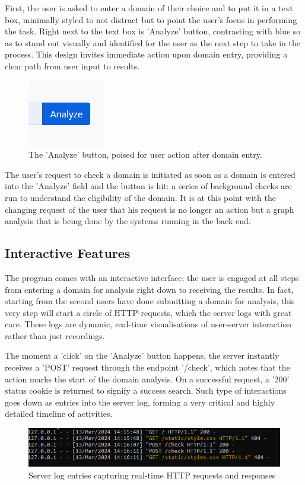 First, the user is asked to enter a domain of their choice and to put it in a text box, minimally styled to not distract but to point the user's focus in performing the task. Right next to the text box is 'Analyze' button, contrasting with blue so as to stand out visually and identified for the user as the next step to take in the process. This design invites immediate action upon domain entry, providing a clear path from user input to results.

\begin{figure}[H]
    \centering
    \includegraphics[width=0.3\linewidth]{project/8.png}
    \caption{The 'Analyze' button, poised for user action after domain entry.}
    \label{fig:imple2222}
\end{figure}

The user's request to check a domain is initiated as soon as a domain is entered into the 'Analyze' field and the button is hit: a series of background checks are run to understand the eligibility of the domain. It is at this point with the changing request of the user that his request is no longer an action but a graph analysis that is being done by the systems running in the back end.

\subsection{Interactive Features}

The program comes with an interactive interface; the user is engaged at all steps from entering a domain for analysis right down to receiving the results. In fact, starting from the second users have done submitting a domain for analysis, this very step will start a circle of HTTP-requests, which the server logs with great care. These logs are dynamic, real-time visualisations of user-server interaction rather than just recordings.


The moment a 'click' on the 'Analyze' button happens, the server instantly receives a 'POST' request through the endpoint '/check', which notes that the action marks the start of the domain analysis. On a successful request, a '200' status cookie is returned to signify a success search. Such type of interactions goes down as entries into the server log, forming a very critical and highly detailed timeline of activities.
\begin{figure}[H]
    \centering
    \includegraphics[width=0.8\linewidth]{project/I.png}
    \caption{Server log entries capturing real-time HTTP requests and responses}
    \label{fig:imple22222}
\end{figure}

